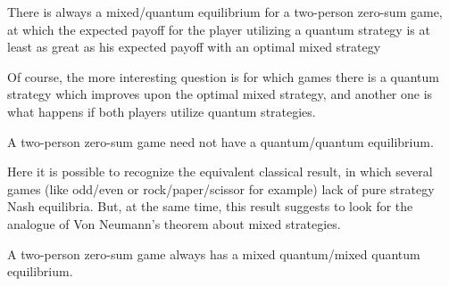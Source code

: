 \begin{theorem}
There is always a mixed/quantum equilibrium for a two-person zero-sum
game, at which the expected payoff for the player utilizing a quantum strategy is at least
as great as his expected payoff with an optimal mixed strategy
\end{theorem}
Of course, the more interesting question is for which games there is a quantum strategy
which improves upon the optimal mixed strategy, and another one is what happens if both players utilize quantum strategies.
\begin{theorem}
A two-person zero-sum game need not have a quantum/quantum equilibrium.
\end{theorem}
Here it is possible to recognize the equivalent classical result, in which several games (like odd/even or rock/paper/scissor for example) lack of pure strategy Nash equilibria. But, at the same time, this result suggests to look for the analogue of Von Neumann's theorem about mixed strategies.
\begin{theorem}
A two-person zero-sum game always has a mixed quantum/mixed quantum
equilibrium.
\end{theorem}

